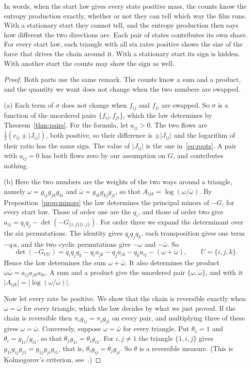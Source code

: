 \documentclass[11pt]{article}
\theoremstyle{definition}
\theoremstyle{remark}
\begin{document}
In words, when the start law gives every state positive mass, the counts know
the entropy production exactly, whether or not they can tell which way the
film runs. With a stationary start they cannot tell, and the entropy
production then says how different the two directions are. Each pair of states
contributes its own share. For every start law, each triangle with all six
rates positive shows the size of the force that drives the chain around it.
With a stationary start its sign is hidden. With another start the counts may
show the sign as well.

\begin{proof}
Both parts use the same remark. The counts know a sum and a product, and the
quantity we want does not change when the two numbers are swapped.

(a) Each term of $\sigma$ does not change when $f_{ij}$ and $f_{ji}$ are
swapped. So $\sigma$ is a function of the unordered pairs
$\{f_{ij},f_{ji}\}$, which the law determines by Theorem~\ref{thm:pairs}. For
the formula, let $a_{ij}>0$. The two flows are
$\frac12(c_{ij}\pm\lvert J_{ij}\rvert)$, both positive, so their difference is
$\pm\lvert J_{ij}\rvert$ and the logarithm of their ratio has the same sign.
The value of $\lvert J_{ij}\rvert$ is the one in~\eqref{eq:roots}. A pair with
$a_{ij}=0$ has both flows zero by our assumption on $G$, and contributes
nothing.

(b) Here the two numbers are the weights of the two ways around a triangle,
namely $\omega=g_{ij}g_{jk}g_{ki}$ and $\bar\omega=g_{ik}g_{kj}g_{ji}$, so that
$A_{ijk}=\log(\omega/\bar\omega)$. By Proposition~\ref{prop:minors} the law
determines the principal minors of $-G$, for every start law. Those of order one
are the $q_i$, and those of order two give
$a_{ij}=q_iq_j-\det(-G_{\{i,j\}\{i,j\}})$. For order three we expand the
determinant over the six permutations. The identity gives $q_iq_jq_k$, each
transposition gives one term $-q\,a$, and the two cyclic permutations give
$-\omega$ and $-\bar\omega$. So
\[
 \det(-G_{UU})=q_iq_jq_k-q_ia_{jk}-q_ja_{ik}-q_ka_{ij}-(\omega+\bar\omega),
 \qquad U=\{i,j,k\}.
\]
Hence the law determines the sum $\omega+\bar\omega$. It also determines the
product $\omega\bar\omega=a_{ij}a_{jk}a_{ki}$. A sum and a product give the
unordered pair $\{\omega,\bar\omega\}$, and with it
$\lvert A_{ijk}\rvert=\lvert\log(\omega/\bar\omega)\rvert$.

Now let every rate be positive. We show that the chain is reversible exactly
when $\omega=\bar\omega$ for every triangle, which the law decides by what we
just proved. If the chain is reversible then $\pi_ig_{ij}=\pi_jg_{ji}$ on every
pair, and multiplying three of these gives $\omega=\bar\omega$. Conversely,
suppose $\omega=\bar\omega$ for every triangle. Put $\theta_1=1$ and
$\theta_i=g_{1i}/g_{i1}$, so that $\theta_1g_{1i}=\theta_ig_{i1}$. For
$i,j\ne1$ the triangle $\{1,i,j\}$ gives
$g_{1i}g_{ij}g_{j1}=g_{1j}g_{ji}g_{i1}$, that is,
$\theta_ig_{ij}=\theta_jg_{ji}$. So $\theta$ is a reversible measure. (This is
Kolmogorov's criterion, see~\cite{kelly1979}.)
\end{proof}
\end{document}
